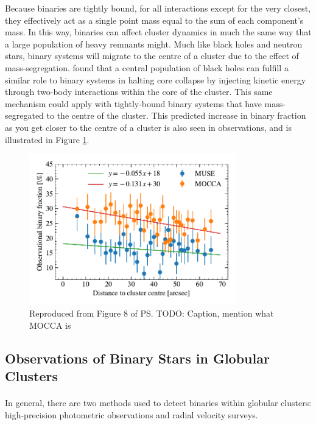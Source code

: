 Because binaries are tightly bound, for all interactions except for the very closest, they
effectively act as a single point mass equal to the sum of each component's mass. In this way,
binaries can affect cluster dynamics in much the same way that a large population of heavy remnants
might. Much like black holes and neutron stars, binary systems will migrate to the centre of a
cluster due to the effect of mass-segregation. \citet{Kremer2019} found that a central population of
black holes can fulfill a similar role to binary systems in halting core collapse by injecting
kinetic energy through two-body interactions within the core of the cluster. This same mechanism
could apply with tightly-bound binary systems that have mass-segregated to the centre of the
cluster. This predicted increase in binary fraction as you get closer to the centre of a cluster is
also seen in observations, and is illustrated in Figure \ref{fig:1/radial_binary_fraction}.



\begin{figure}
	\centering
	\includegraphics[width=0.8\textwidth]{figures/radial_binarity.pdf}
	\caption{Reproduced from Figure 8 of \citet{Giesers2019} \ps{TODO: Caption, mention what MOCCA is}}
	\label{fig:1/radial_binary_fraction}
\end{figure}

\subsection{Observations of Binary Stars in Globular Clusters}

\paragraph{}
In general, there are two methods used to detect binaries within globular clusters: high-precision
photometric observations and radial velocity surveys.

